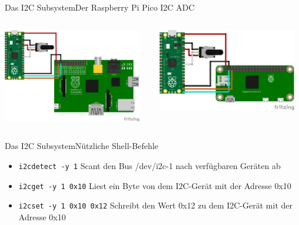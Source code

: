 \documentclass[aspectratio=169]{beamer}
\begin{document}
\begin{frame}[fragile]{Das I2C Subsystem}{Der Raspberry Pi Pico I2C ADC}
	\begin{columns}
		\begin{column}{0.5\textwidth}
			\begin{center}
				\includegraphics[width=0.95\textwidth]{Bilder/Setup_Pi_1.png}
			\end{center}
		\end{column}
		\begin{column}{0.5\textwidth}  %
			\begin{center}
				\includegraphics[width=0.95\textwidth]{Bilder/Setup_Pi_Zero.png}
			\end{center}
		\end{column}
	\end{columns}
\end{frame}

\begin{frame}[fragile]{Das I2C Subsystem}{Nützliche Shell-Befehle}
	\begin{itemize}
		\item \lstinline|i2cdetect -y 1| Scant den Bus /dev/i2c-1 nach verfügbaren Geräten ab
		\item \lstinline|i2cget -y 1 0x10| Liest ein Byte von dem I2C-Gerät mit der Adresse 0x10
		\item \lstinline|i2cset -y 1 0x10 0x12| Schreibt den Wert 0x12 zu dem I2C-Gerät mit der Adresse 0x10
	\end{itemize}
\end{frame}
\end{document}
